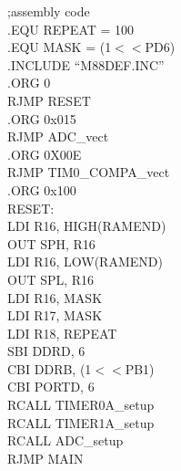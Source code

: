 \documentclass[titlepage, a4paper, 10pt, reqno, openany]{report}
\begin{document}
\begin{minipage}[t]{.45\linewidth}
\scriptsize
;assembly code \\
.EQU REPEAT = 100 \\
.EQU MASK = (1$<<$PD6) \\
.INCLUDE \textquotedblleft M88DEF.INC\textquotedblright \\
.ORG 0 \\
\hspace*{.5cm}	RJMP RESET \\
.ORG 0x015 \\
\hspace*{.5cm}	RJMP ADC\_vect \\
.ORG 0X00E \\
\hspace*{.5cm}	RJMP TIM0\_COMPA\_vect \\
.ORG 0x100 \\
RESET: \\
\hspace*{.5cm}	LDI R16, HIGH(RAMEND) \\
\hspace*{.5cm}	OUT SPH, R16 \\
\hspace*{.5cm}	LDI R16, LOW(RAMEND) \\
\hspace*{.5cm}	OUT SPL, R16 \\
\hspace*{.5cm}	LDI R16, MASK \\
\hspace*{.5cm}	LDI R17, MASK \\
\hspace*{.5cm}	LDI R18, REPEAT \\
\hspace*{.5cm}	SBI DDRD, 6 \\
\hspace*{.5cm}	CBI DDRB, (1$<<$PB1) \\
\hspace*{.5cm}	CBI PORTD, 6 \\
\hspace*{.5cm}	RCALL TIMER0A\_setup \\
\hspace*{.5cm}	RCALL TIMER1A\_setup \\
\hspace*{.5cm}	RCALL ADC\_setup \\
\hspace*{.5cm}	RJMP MAIN \\
\newline

\end{minipage}
\end{document}
